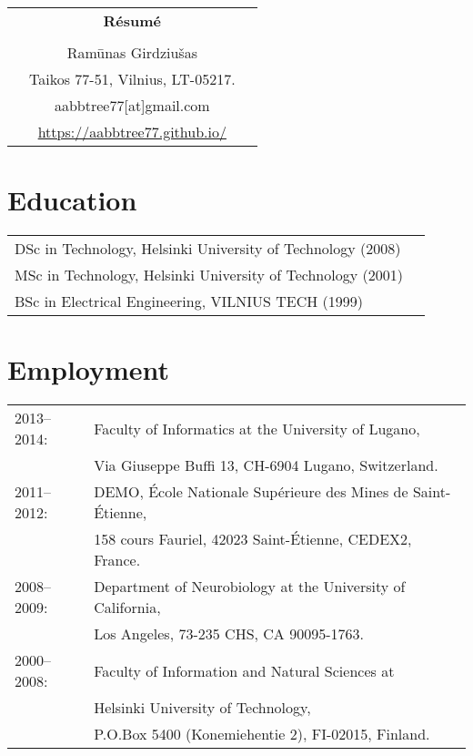 \documentclass[a4paper,11pt]{article}
\begin{document}
\thispagestyle{empty}

%
%
\begin{center}
\begin{tabular}{ccc}
&\Large \textbf{R\'{e}sum\'{e}}&\\
\\
& Ram\={u}nas Girdziu\v{s}as &\\  
& Taikos 77-51, Vilnius, LT-05217. &\\
& aabbtree77[at]gmail.com &\\
& \url{https://aabbtree77.github.io/}
\end{tabular}
\end{center}
%
\section*{Education}
%
\begin{tabular}{ll}
        DSc in Technology, Helsinki University of Technology (2008)\\
        MSc in Technology, Helsinki University of Technology (2001)\\
        BSc in Electrical Engineering, VILNIUS TECH (1999)
\end{tabular}
%
\section*{Employment}
%
\begin{tabular}{ll}
2013--2014: & Faculty of Informatics at the University of Lugano,\\
                        & Via Giuseppe Buffi 13, CH-6904 Lugano, Switzerland. 
\\
2011--2012: & DEMO, \'{E}cole Nationale Sup\'{e}rieure des Mines de Saint-\'{E}tienne,\\
&158 cours Fauriel, 42023 Saint-\'Etienne, CEDEX2, France.
\\
2008--2009: & Department of Neurobiology at the University of California,\\
&Los Angeles, 73-235 CHS, CA 90095-1763.
\\
2000--2008: & Faculty of Information and Natural Sciences at\\
            & Helsinki University of Technology,\\ 
&  P.O.Box 5400 (Konemiehentie 2), FI-02015, Finland.
\end{tabular}
\end{document}
